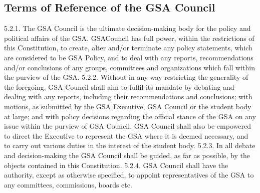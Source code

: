 \documentclass{article}
\begin{document}
\subsection{Terms of Reference of the GSA Council }
5.2.1. The GSA Council is the ultimate decision-making body for the policy 
and political affairs of the GSA. GSACouncil has full power, within 
the restrictions of this Constitution, to create, alter and/or terminate 
any policy statements, which are considered to be GSA Policy, and to 
deal with any reports, recommendations and/or conclusions of any 
groups, committees and organizations which fall within the purview of 
the GSA. 
5.2.2. Without in any way restricting the generality of the foregoing, GSA 
Council shall aim to fulfil its mandate by debating and dealing with 
any reports, including their recommendations and conclusions; with 
motions, as submitted by the GSA Executive, GSA Council or the 
student body at large; and with policy decisions regarding the official 
stance of the GSA on any issue within the purview of GSA Council. 
GSA Council shall also be empowered to direct the Executive to 
represent the GSA where it is deemed necessary, and to carry out 
various duties in the interest of the student body. 
5.2.3. In all debate and decision-making the GSA Council shall be guided, as 
far as possible, by the objects contained in this Constitution. 
5.2.4. GSA Council shall have the authority, except as otherwise specified, to 
appoint representatives of the GSA to any committees, commissions, 
boards etc.
\end{document}
